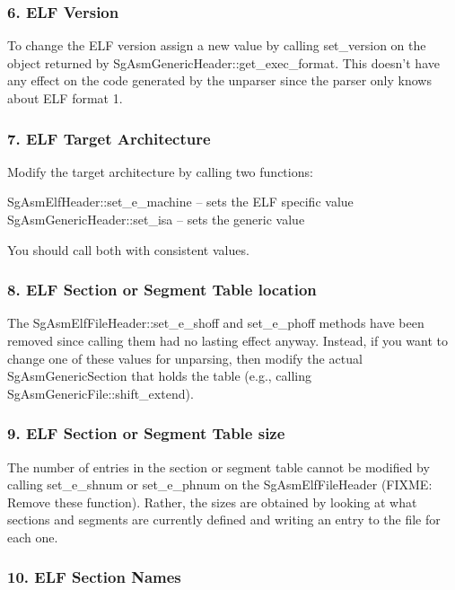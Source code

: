 \subsubsection{6. ELF Version}

   To change the ELF version assign a new value by calling set\_version on the object returned by
   SgAsmGenericHeader::get\_exec\_format.  This doesn't have any effect on the code generated by the unparser since the parser
   only knows about ELF format 1.
   
\subsubsection{7. ELF Target Architecture}

   Modify the target architecture by calling two functions:

       SgAsmElfHeader::set\_e\_machine -- sets the ELF specific value
       SgAsmGenericHeader::set\_isa   -- sets the generic value

   You should call both with consistent values.

\subsubsection{8. ELF Section or Segment Table location}

   The SgAsmElfFileHeader::set\_e\_shoff and set\_e\_phoff methods have been removed since calling them had no lasting effect
   anyway. Instead, if you want to change one of these values for unparsing, then modify the actual SgAsmGenericSection that
   holds the table (e.g., calling SgAsmGenericFile::shift\_extend).

\subsubsection{9. ELF Section or Segment Table size}

   The number of entries in the section or segment table cannot be modified by calling set\_e\_shnum or set\_e\_phnum on the
   SgAsmElfFileHeader (FIXME: Remove these function). Rather, the sizes are obtained by looking at what sections and segments
   are currently defined and writing an entry to the file for each one.

\subsubsection{10. ELF Section Names}

